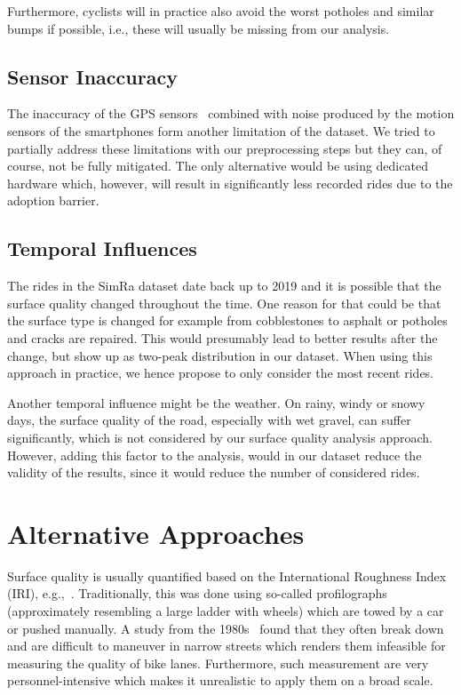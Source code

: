 Furthermore, cyclists will in practice also avoid the worst potholes and similar bumps if possible, i.e., these will usually be missing from our analysis.

\subsection{Sensor Inaccuracy}
\label{subsec:sensor_inaccuracy}
The inaccuracy of the GPS sensors~\cite{merry2019smartphone} combined with noise produced by the motion sensors of the smartphones form another limitation of the dataset.
We tried to partially address these limitations with our preprocessing steps but they can, of course, not be fully mitigated.
The only alternative would be using dedicated hardware which, however, will result in significantly less recorded rides due to the adoption barrier.

\subsection{Temporal Influences}
\label{subsec:temporal_influences}
The rides in the SimRa dataset date back up to 2019 and it is possible that the surface quality changed throughout the time.
One reason for that could be that the surface type is changed for example from cobblestones to asphalt or potholes and cracks are repaired.
This would presumably lead to better results after the change, but show up as two-peak distribution in our dataset.
When using this approach in practice, we hence propose to only consider the most recent rides.

Another temporal influence might be the weather.
On rainy, windy or snowy days, the surface quality of the road, especially with wet gravel, can suffer significantly, which is not considered by our surface quality analysis approach.
However, adding this factor to the analysis, would in our dataset reduce the validity of the results, since it would reduce the number of considered rides.


\section{Alternative Approaches}
\label{sec:related_work_cyclequality}
Surface quality is usually quantified based on the International Roughness Index (IRI), e.g.,~\cite{sayers1986The}.
Traditionally, this was done using so-called profilographs (approximately resembling a large ladder with wheels) which are towed by a car or pushed manually.
A study from the 1980s~\cite{cumbaa1986road} found that they often break down and are difficult to maneuver in narrow streets which renders them infeasible for measuring the quality of bike lanes.
Furthermore, such measurement are very personnel-intensive which makes it unrealistic to apply them on a broad scale.

